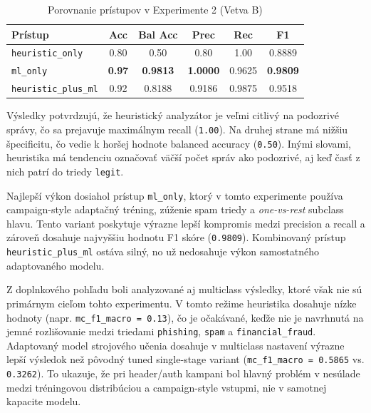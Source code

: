 \documentclass[conference]{IEEEtran}
\begin{document}
\begin{table}[H]
\centering
\caption{Porovnanie prístupov v Experimente 2 (Vetva B)}
\label{tab:exp2_comparison}
\footnotesize
\setlength{\tabcolsep}{4pt}
\renewcommand{\arraystretch}{1.1}
\begin{tabular}{lccccc}
\toprule
\textbf{Prístup} & \textbf{Acc} & \textbf{Bal Acc} & \textbf{Prec} & \textbf{Rec} & \textbf{F1} \\
\midrule
\texttt{heuristic\_only}        & 0.80 & 0.50  & 0.80   & 1.00 & 0.8889 \\
\texttt{ml\_only}               & \textbf{0.97} & \textbf{0.9813} & \textbf{1.0000} & 0.9625 & \textbf{0.9809} \\
\texttt{heuristic\_plus\_ml}    & 0.92 & 0.8188 & 0.9186 & 0.9875 & 0.9518 \\
\bottomrule
\end{tabular}
\end{table}

Výsledky potvrdzujú, že heuristický analyzátor je veľmi citlivý na podozrivé správy, čo sa prejavuje maximálnym recall (\texttt{1.00}). Na druhej strane má nižšiu špecificitu, čo vedie k horšej hodnote balanced accuracy (\texttt{0.50}). Inými slovami, heuristika má tendenciu označovať väčší počet správ ako podozrivé, aj keď časť z nich patrí do triedy \texttt{legit}.

Najlepší výkon dosiahol prístup \texttt{ml\_only}, ktorý v tomto experimente používa campaign-style adaptačný tréning, zúženie spam triedy a \textit{one-vs-rest} subclass hlavu. Tento variant poskytuje výrazne lepší kompromis medzi precision a recall a zároveň dosahuje najvyššiu hodnotu F1 skóre (\texttt{0.9809}). Kombinovaný prístup \texttt{heuristic\_plus\_ml} ostáva silný, no už nedosahuje výkon samostatného adaptovaného modelu.

Z doplnkového pohľadu boli analyzované aj multiclass výsledky, ktoré však nie sú primárnym cieľom tohto experimentu. V tomto režime heuristika dosahuje nízke hodnoty (napr. \texttt{mc\_f1\_macro = 0.13}), čo je očakávané, keďže nie je navrhnutá na jemné rozlišovanie medzi triedami \texttt{phishing}, \texttt{spam} a \texttt{financial\_fraud}. Adaptovaný model strojového učenia dosahuje v multiclass nastavení výrazne lepší výsledok než pôvodný tuned single-stage variant (\texttt{mc\_f1\_macro = 0.5865} vs. \texttt{0.3262}). To ukazuje, že pri header/auth kampani bol hlavný problém v nesúlade medzi tréningovou distribúciou a campaign-style vstupmi, nie v samotnej kapacite modelu.
\end{document}
